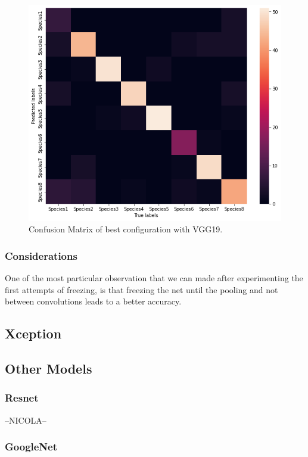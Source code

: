 \documentclass[10pt]{article}
\begin{document}
\begin{figure}[ht]
\begin{center}
\centerline{\includegraphics[width=\columnwidth]{VGG19_best}}
\caption{Confusion Matrix of best configuration with VGG19.}
\label{bayespic}
\end{center}
\end{figure}
\subsubsection{Considerations}
One of the most particular observation that we can made after experimenting the first attempts of freezing, is that freezing the net
until the pooling and not between convolutions leads to a better accuracy.

\subsection{Xception}

\subsection{Other Models}
\subsubsection{Resnet}
--NICOLA--
\subsubsection{GoogleNet}
\end{document}
